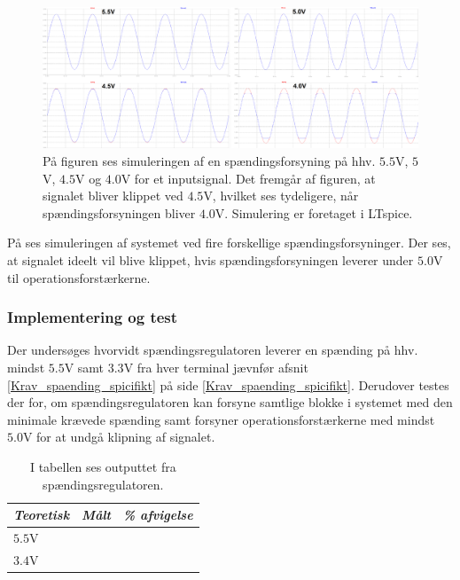\begin{figure}[H]
	\centering
	\includegraphics[scale=0.2]{figures/cProblemloesning/Spaendingsforsyning2.PNG}
	\caption{På figuren ses simuleringen af en spændingsforsyning på hhv. $5.5$V, $5$V, $4.5$V og $4.0$V for et inputsignal. Det fremgår af figuren, at signalet bliver klippet ved $4.5$V, hvilket ses tydeligere, når spændingsforsyningen bliver $4.0$V. Simulering er foretaget i LTspice.}
	\label{fig:spaendingsforsyning_graf}
\end{figure}
På  ses simuleringen af systemet ved fire forskellige spændingsforsyninger. Der ses, at signalet ideelt vil blive klippet, hvis spændingsforsyningen leverer under $5.0$V til operationsforstærkerne.

\subsubsection{Implementering og test}
Der undersøges hvorvidt spændingsregulatoren leverer en spænding på hhv. mindst $5.5$V samt $3.3$V fra hver terminal jævnfør afsnit \ref{Krav_spaending_spicifikt} på side \ref{Krav_spaending_spicifikt}. Derudover testes der for, om spændingsregulatoren kan forsyne samtlige blokke i systemet med den minimale krævede spænding samt forsyner operationsforstærkerne med mindst $5.0$V for at undgå klipning af signalet. \\
\begin{table}[H]
	\centering
	\begin{tabular}{|l|l|l|}
		\hline
		\textit{Teoretisk} & \textit{Målt} & \textit{\% afvigelse} \\ \hline
		$5.5$V             &               &                       \\ \hline
		$3.4$V             &               &                       \\ \hline
	\end{tabular}
	\caption{I tabellen ses outputtet fra spændingsregulatoren. }
	\label{tab:spaending_resultat}
\end{table}
 
